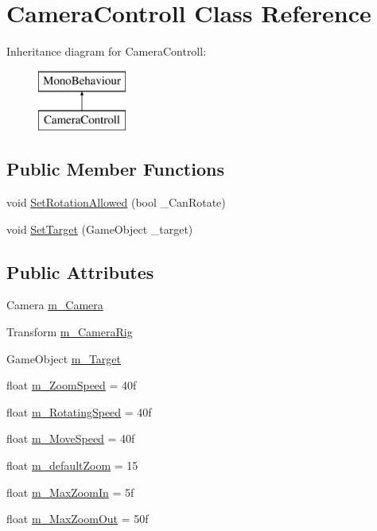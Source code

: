 \hypertarget{class_camera_controll}{}\section{Camera\+Controll Class Reference}
\label{class_camera_controll}
Inheritance diagram for Camera\+Controll\+:\begin{figure}[H]
\begin{center}
\leavevmode
\includegraphics[height=2.000000cm]{class_camera_controll}
\end{center}
\end{figure}
\subsection*{Public Member Functions}
\begin{DoxyCompactItemize}
\item 
void \mbox{\hyperlink{class_camera_controll_a87cbabdae595f2213683728da18bde66}{Set\+Rotation\+Allowed}} (bool \+\_\+\+Can\+Rotate)
\item 
void \mbox{\hyperlink{class_camera_controll_a447c8b3d7830c882459aa0f948326676}{Set\+Target}} (Game\+Object \+\_\+target)
\end{DoxyCompactItemize}
\subsection*{Public Attributes}
\begin{DoxyCompactItemize}
\item 
Camera \mbox{\hyperlink{class_camera_controll_a15df1b4f5208f83a9f1332ef79ad4c81}{m\+\_\+\+Camera}}
\item 
Transform \mbox{\hyperlink{class_camera_controll_a2d8024dee8af08a5bbcf59e0fea23fba}{m\+\_\+\+Camera\+Rig}}
\item 
Game\+Object \mbox{\hyperlink{class_camera_controll_a780ffba01532dd926e98880f51d9d443}{m\+\_\+\+Target}}
\item 
float \mbox{\hyperlink{class_camera_controll_a49e1e88b1bf4bf23317ed22ee190c2c4}{m\+\_\+\+Zoom\+Speed}} = 40f
\item 
float \mbox{\hyperlink{class_camera_controll_a78986d85b7e4cc0edd711d814ae0a2c1}{m\+\_\+\+Rotating\+Speed}} = 40f
\item 
float \mbox{\hyperlink{class_camera_controll_aff6d7ebc41d3942ba70dce5fb8ae33b0}{m\+\_\+\+Move\+Speed}} = 40f
\item 
float \mbox{\hyperlink{class_camera_controll_a2eba5a13b3e9dc545222313492a8266e}{m\+\_\+default\+Zoom}} = 15
\item 
float \mbox{\hyperlink{class_camera_controll_a09694dcebd7e30ef6e8997631bcadc6c}{m\+\_\+\+Max\+Zoom\+In}} = 5f
\item 
float \mbox{\hyperlink{class_camera_controll_ad31923eaa80fb655c0c1112be537227d}{m\+\_\+\+Max\+Zoom\+Out}} = 50f
\end{DoxyCompactItemize}


